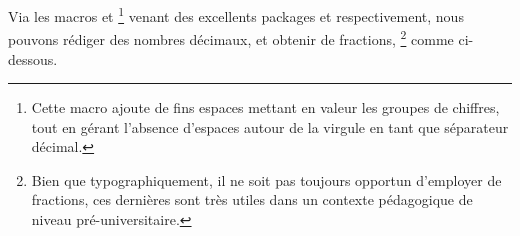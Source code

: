\documentclass{tutodoc}
\begin{document}

\begin{tdoctip}
%
    Via les macros  et %
    \footnote{
    	Cette macro ajoute de fins espaces mettant en valeur les groupes de chiffres, tout en gérant l'absence d'espaces autour de la virgule en tant que séparateur décimal.
    }
    venant des excellents packages  et  respectivement,
    nous pouvons rédiger des nombres décimaux, et obtenir de  fractions,%
    \footnote{
    	Bien que typographiquement, il ne soit pas toujours opportun d'employer de  fractions, ces dernières sont très utiles dans un contexte pédagogique de niveau pré-universitaire.
    }
    comme ci-dessous.

\end{tdoctip}
\end{document}
